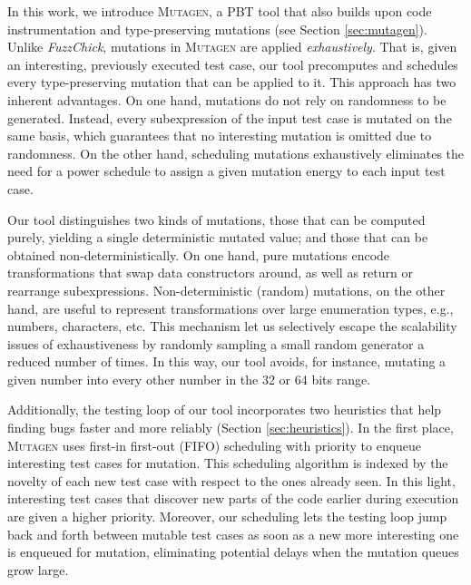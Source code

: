 \documentclass[acmsmall, anonymous]{acmart}
\newcommand{\fuzzchick}{\textit{FuzzChick}\xspace}
\newcommand{\mutagen}{\textsc{Mutagen}\xspace}
\begin{document}
In this work, we introduce \mutagen, a PBT tool %
that also builds upon code instrumentation and type-preserving mutations (see
Section \ref{sec:mutagen}).
%
%
%
Unlike \fuzzchick, mutations in \mutagen are applied \emph{exhaustively}.
%
That is, given an interesting, previously executed test case, our tool
precomputes and schedules every type-preserving mutation that can be applied to
it.
%
This approach has two inherent advantages. %
%
On one hand, mutations do not rely on randomness to be generated.
%
Instead, every subexpression of the input test case is mutated on the same
basis, which guarantees that no interesting mutation is omitted due to
randomness.
%
%
On the other hand, scheduling mutations exhaustively eliminates the need for a
power schedule to assign a given mutation energy to each input test case.


%
Our tool distinguishes two kinds of mutations, those that can be computed
purely, yielding a single deterministic mutated value; and those that can be
obtained non-deterministically.
%
On one hand, pure mutations encode transformations that swap data constructors
around, as well as return or rearrange subexpressions.
%
Non-deterministic (random) mutations, on the other hand, are useful to represent
transformations over large enumeration types, e.g., numbers, characters, etc.
%
This mechanism let us selectively escape the scalability issues of
exhaustiveness by randomly sampling a small random generator a reduced number of
times.
%
In this way, our tool avoids, for instance, mutating a given number into every
other number in the 32 or 64 bits range.


Additionally, the testing loop of our tool incorporates two heuristics that help
finding bugs faster and more reliably (Section \ref{sec:heuristics}).
%
In the first place, \mutagen uses first-in first-out (FIFO) scheduling with
priority to enqueue interesting test cases for mutation.
%
This scheduling algorithm is indexed by the novelty of each new test case with
respect to the ones already seen.
%
In this light, interesting test cases that discover new parts of the code
earlier during execution are given a higher priority.
%
Moreover, our scheduling lets the testing loop jump back and forth between
mutable test cases as soon as a new more interesting one is enqueued for
mutation, eliminating potential delays when the mutation queues grow large.
\end{document}
